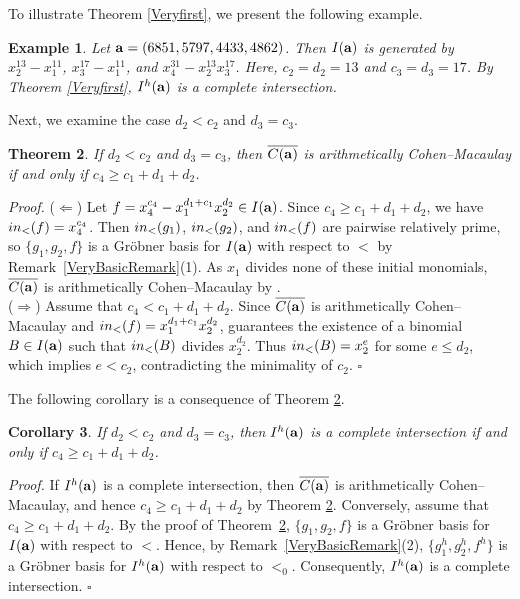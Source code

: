 \documentclass[10pt,a4paper]{amsart}
\newtheorem{thm1}{Theorem}[section]
\newtheorem{cor1}[thm1]{Corollary}
\newtheorem{ex1}[thm1]{Example}
\begin{document}
To illustrate Theorem \ref{Veryfirst}, we present the following example.

\begin{ex1} {\rm Let ${\bf a}=(6851, 5797, 4433, 4862)$. Then $I({\bf a})$ is generated by $x_{2}^{13}-x_1^{11}$, $x_{3}^{17}-x_{1}^{11}$, and $x_{4}^{31}-x_{2}^{13}x_{3}^{17}$. Here, $c_2=d_2=13$ and $c_3=d_3=17$. By Theorem \ref{Veryfirst}, $I^{h}({\bf a})$ is a complete intersection.}
\end{ex1}

Next, we examine the case $d_2<c_2$ and $d_3=c_3$.

\begin{thm1} \label{ACM5} If $d_2<c_{2}$ and $d_{3}=c_3$, then $\overline{C({\bf a})}$ is arithmetically Cohen--Macaulay if and only if $c_{4} \geq c_1+d_{1}+d_{2}$.
\end{thm1}

{\em \noindent Proof.} ($\Leftarrow$) Let $f=x_{4}^{c_4}-x_{1}^{d_1+c_1}x_{2}^{d_2} \in I({\bf a})$. Since $c_{4} \geq c_1+d_{1}+d_{2}$, we have ${\rm in}_{<}(f)=x_{4}^{c_4}$. Then ${\rm in}_{<}(g_1)$, ${\rm in}_{<}(g_2)$, and ${\rm in}_{<}(f)$ are pairwise relatively prime, so $\{g_1, g_2, f\}$ is a Gr\"obner basis for $I({\bf a})$ with respect to $<$ by Remark~\ref{VeryBasicRemark}(1). As $x_1$ divides none of these initial monomials, $\overline{C({\bf a})}$ is arithmetically Cohen--Macaulay by \cite[Theorem 2.2]{HerSta}.\\
($\Rightarrow$) Assume that $c_{4}<c_1+d_{1}+d_{2}$. Since $\overline{C({\bf a})}$ is arithmetically Cohen--Macaulay and ${\rm in}_{<}(f)=x_{1}^{d_1+c_1}x_{2}^{d_2}$, \cite[Theorem~2.2]{HerSta} guarantees the existence of a binomial $B \in I({\bf a})$ such that ${\rm in}_{<}(B)$ divides $x_{2}^{d_2}$. Thus ${\rm in}_{<}(B)=x_{2}^{e}$ for some $e \leq d_2$, which implies $e<c_2$, contradicting the minimality of $c_2$. \hfill $\square$ \par\vspace{0.5\baselineskip}

The following corollary is a consequence of Theorem \ref{ACM5}.

\begin{cor1} \label{Cor12} If $d_2<c_{2}$ and $d_{3}=c_3$, then $I^{h}({\bf a})$ is a complete intersection if and only if $c_{4} \geq c_1+d_{1}+d_{2}$.
\end{cor1}

{\em \noindent Proof.} If $I^{h}({\bf a})$ is a complete intersection, then $\overline{C({\bf a})}$ is arithmetically Cohen--Macaulay, and hence $c_{4} \geq c_1+d_{1}+d_{2}$ by Theorem \ref{ACM5}. Conversely, assume that $c_{4} \geq c_1+d_{1}+d_{2}$. By the proof of Theorem~\ref{ACM5}, $\{g_1,g_2,f\}$ is a Gr\"obner basis for $I({\bf a})$ with respect to $<$. Hence, by Remark~\ref{VeryBasicRemark}(2), $\{g_1^{h},g_2^{h},f^{h}\}$ is a Gr\"obner basis for $I^{h}({\bf a})$ with respect to $<_0$. Consequently, $I^{h}({\bf a})$ is a complete intersection. \hfill $\square$ \par\vspace{0.5\baselineskip}
\end{document}
